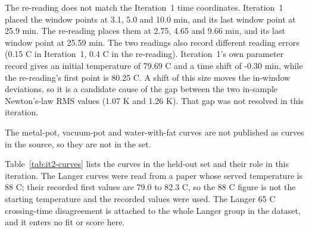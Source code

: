 \documentclass[11pt,letterpaper]{article}
\begin{document}
The re-reading does not match the Iteration~1 time coordinates. Iteration~1 placed the window points at 3.1, 5.0 and 10.0 min, and its last window point at 25.9 min. The re-reading places them at 2.75, 4.65 and 9.66 min, and its last window point at 25.59 min. The two readings also record different reading errors (0.15 C in Iteration~1, 0.4 C in the re-reading). Iteration~1's own parameter record gives an initial temperature of 79.69 C and a time shift of -0.30 min, while the re-reading's first point is 80.25 C. A shift of this size moves the in-window deviations, so it is a candidate cause of the gap between the two in-sample Newton's-law RMS values (1.07 K and 1.26 K). That gap was not resolved in this iteration.

The metal-pot, vacuum-pot and water-with-fat curves are not published as curves in the source, so they are not in the set.

Table~\ref{tab:it2-curves} lists the curves in the held-out set and their role in this iteration. The Langer curves were read from a paper whose served temperature is 88 C; their recorded first values are 79.0 to 82.3 C, so the 88 C figure is not the starting temperature and the recorded values were used. The Langer 65 C crossing-time disagreement is attached to the whole Langer group in the dataset, and it enters no fit or score here.
\end{document}
